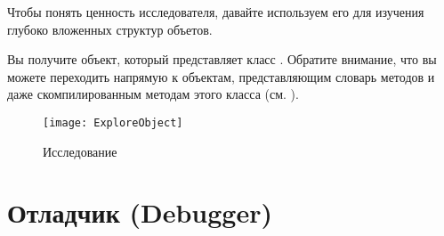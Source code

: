 \documentclass[a4paper,10pt,twoside]{book}
\begin{document}
Чтобы понять ценность исследователя, давайте используем его для изучения глубоко вложенных структур объетов.

Вы получите объект, который представляет класс .
Обратите внимание, что вы можете переходить напрямую к объектам, представляющим словарь методов и даже скомпилированным методам этого класса (см. ).

\begin{figure}[tbp]
	\begin{center}
		\texttt{[image: ExploreObject]}
	\end{center}
	\caption{Исследование \ct{ExploreObject}}
\end{figure}

%

\section{Отладчик (Debugger)}
\end{document}

